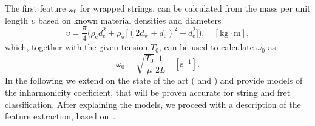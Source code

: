 \documentclass{article}
\begin{document}
\begin{sloppy}
%
%
%
%
%
The first feature $\omega_0$ for wrapped strings, can be calculated from the mass per unit length $\upsilon$ based on known material densities and diameters \cite{firth1984}
\begin{equation}
    \upsilon = \frac{\pi}{4}\Big(\rho_\text{c}d_\text{c}^2 + \rho_\text{w}\big[(2d_\text{w}+d_\text{c})^2-d_\text{c}^2\big]\Big), \quad [\text{kg}\cdot\text{m}],
\end{equation}
which, together with the given tension $T_0$, can be used to calculate $\omega_0$ as
\begin{equation}\label{eq:omega_0}
    \omega_0 = \sqrt{\frac{T_0}{\mu}} \frac{1}{2L} \quad [\text{s}^{-1}].
\end{equation}
In the following we extend on the state of the art (\cite{rossing:science_of_string_instruments} and \cite{inharmonicityCalculationSource}) and provide models of %
the inharmonicity coefficient, that will be proven accurate for string and fret classification. After explaining the models, we proceed with a description of the feature extraction, based on~\cite{hjerrild::icassp19}.
%
%

\end{sloppy}
\end{document}
